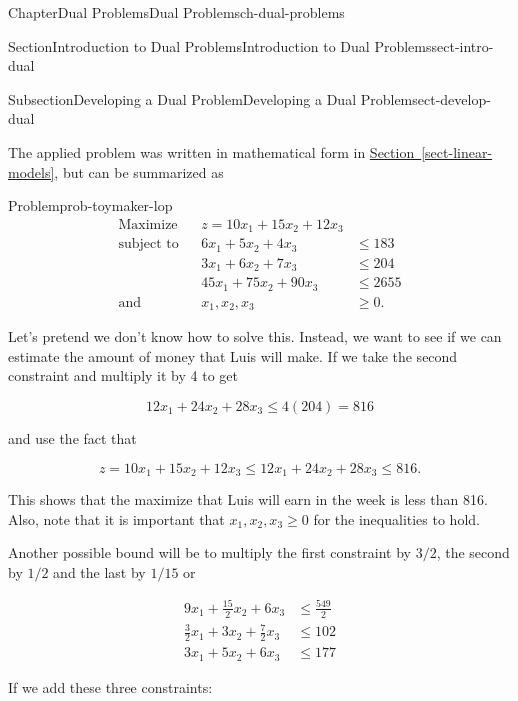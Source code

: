 \documentclass[oneside,10pt,]{book}
\newcommand{\xreffont}{\relax}
\numberwithin{equation}{section}
\newcommand{\amp}{&}
\begin{document}
\begin{chapterptx}{Chapter}{Dual Problems}{}{Dual Problems}{}{}{ch-dual-problems}
\begin{sectionptx}{Section}{Introduction to Dual Problems}{}{Introduction to Dual Problems}{}{}{sect-intro-dual}
\begin{subsectionptx}{Subsection}{Developing a Dual Problem}{}{Developing a Dual Problem}{}{}{sect-develop-dual}
\par
The applied problem was written in mathematical form in \hyperref[sect-linear-models]{Section~{\xreffont\ref{sect-linear-models}}}, but can be summarized as%
\begin{problem}{Problem}{}{prob-toymaker-lop}%
%
\begin{equation}
\begin{aligned} \text{Maximize} \amp \amp z = 10 x_1 + 15 x_2 + 12 x_3 \amp \\ \text{subject to} \amp \amp  6 x_1 + 5 x_2 + 4 x_3 \amp \leq 183 \\ \amp \amp  3 x_1 + 6 x_2 + 7 x_3 \amp \leq 204 \\ \amp \amp 45 x_1 + 75 x_2 + 90 x_3 \amp  \leq 2655 \\ \text{and} \amp \amp x_1, x_2, x_3 \amp \geq 0.
\end{aligned}\label{eq-toymaker-lop}
\end{equation}
%
\end{problem}
Let's pretend we don't know how to solve this. Instead, we want to see if we can estimate the amount of money that Luis will make. If we take the second constraint and multiply it by 4 to get%
\par
%
\begin{equation*}
12 x_1 + 24x_2 + 28 x_3 \leq 4(204) = 816
\end{equation*}
%
\par
and use the fact that%
\par
%
\begin{equation*}
z = 10 x_1 + 15 x_2 + 12 x_3 \leq 12 x_1 + 24x_2 + 28 x_3  \leq 816.
\end{equation*}
%
\par
This shows that the maximize that Luis will earn in the week is less than \textdollar{}816. Also, note that it is important that \(x_1, x_2, x_3 \geq 0\) for the inequalities to hold.%
\par
Another possible bound will be to multiply the first constraint by \(3/2\), the second by \(1/2\) and the last by \(1/15\) or%
\par
%
\begin{align*}
9 x_1 + \frac{15}{2} x_2 + 6 x_3 \amp \leq  \frac{549}{2} \\
\frac{3}{2}x_1 + 3 x_2 + \frac{7}{2} x_3 \amp \leq  102 \\
3x_1 + 5x_2 + 6x_3 \amp \leq 177
\end{align*}
%
\par
If we add these three constraints:%

\end{subsectionptx}
\end{sectionptx}
\end{chapterptx}
\end{document}
